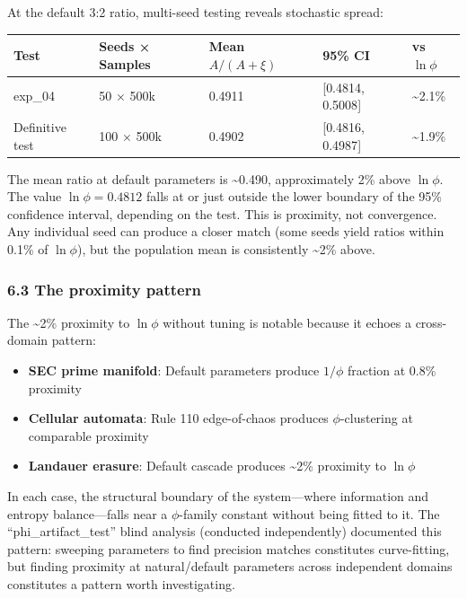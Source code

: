 \documentclass[
  11pt,
  a4paper]{article}
\providecommand{\tightlist}{%
  \setlength{\itemsep}{0pt}\setlength{\parskip}{0pt}}
\begin{document}
At the default 3:2 ratio, multi-seed testing reveals stochastic spread:

\begin{longtable}[]{@{}lllll@{}}
\toprule\noalign{}
Test & Seeds × Samples & Mean \(A/(A+\xi)\) & 95\% CI & vs
\(\ln\phi\) \\
\midrule\noalign{}
\endhead
\bottomrule\noalign{}
\endlastfoot
exp\_04 & 50 × 500k & 0.4911 & {[}0.4814, 0.5008{]} &
\textasciitilde2.1\% \\
Definitive test & 100 × 500k & 0.4902 & {[}0.4816, 0.4987{]} &
\textasciitilde1.9\% \\
\end{longtable}

The mean ratio at default parameters is \textasciitilde0.490,
approximately 2\% above \(\ln\phi\). The value \(\ln\phi = 0.4812\)
falls at or just outside the lower boundary of the 95\% confidence
interval, depending on the test. This is proximity, not convergence. Any
individual seed can produce a closer match (some seeds yield ratios
within 0.1\% of \(\ln\phi\)), but the population mean is consistently
\textasciitilde2\% above.

\subsubsection{6.3 The proximity pattern}\label{the-proximity-pattern}

The \textasciitilde2\% proximity to \(\ln\phi\) without tuning is
notable because it echoes a cross-domain pattern:

\begin{itemize}
\tightlist
\item
  \textbf{SEC prime manifold}: Default parameters produce \(1/\phi\)
  fraction at 0.8\% proximity
\item
  \textbf{Cellular automata}: Rule 110 edge-of-chaos produces
  \(\phi\)-clustering at comparable proximity
\item
  \textbf{Landauer erasure}: Default cascade produces \textasciitilde2\%
  proximity to \(\ln\phi\)
\end{itemize}

In each case, the structural boundary of the system---where information
and entropy balance---falls near a \(\phi\)-family constant without
being fitted to it. The ``phi\_artifact\_test'' blind analysis
(conducted independently) documented this pattern: sweeping parameters
to find precision matches constitutes curve-fitting, but finding
proximity at natural/default parameters across independent domains
constitutes a pattern worth investigating.
\end{document}
